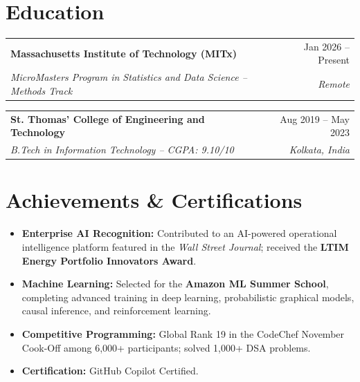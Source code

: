 \documentclass[letterpaper,10pt]{article}
\makeatletter
\newcommand{\resumeSubheading}[4]{
  \begin{tabularx}{\textwidth}{@{}Xr@{}}
    \textbf{#1} & #2 \\
    \textit{\small #3} & \textit{\small #4} \\
  \end{tabularx}\vspace{-5pt}
}
\newcommand{\resumeItem}[1]{\item \small{#1}}
\newcommand{\resumeItemListStart}{
  \begin{itemize}[leftmargin=0.18in,label=\textbullet,itemsep=0pt,topsep=1pt,parsep=0pt,partopsep=0pt]
}
\newcommand{\resumeItemListEnd}{\end{itemize}\vspace{-2pt}}
\makeatother
\begin{document}
\section{Education}

\resumeSubheading
  {Massachusetts Institute of Technology (MITx)}
  {Jan 2026 -- Present}
  {MicroMasters Program in Statistics and Data Science -- Methods Track}
  {Remote}

\resumeSubheading
  {St. Thomas' College of Engineering and Technology}
  {Aug 2019 -- May 2023}
  {B.Tech in Information Technology -- CGPA: 9.10/10}
  {Kolkata, India}

\section{Achievements \& Certifications}
\resumeItemListStart
  \resumeItem{\textbf{Enterprise AI Recognition:} Contributed to an AI-powered operational intelligence platform featured in the \textit{Wall Street Journal}; received the \textbf{LTIM Energy Portfolio Innovators Award}.}
  \resumeItem{\textbf{Machine Learning:} Selected for the \textbf{Amazon ML Summer School}, completing advanced training in deep learning, probabilistic graphical models, causal inference, and reinforcement learning.}
  \resumeItem{\textbf{Competitive Programming:} Global Rank 19 in the CodeChef November Cook-Off among 6,000+ participants; solved 1,000+ DSA problems.}
  \resumeItem{\textbf{Certification:} GitHub Copilot Certified.}
\resumeItemListEnd
\end{document}
